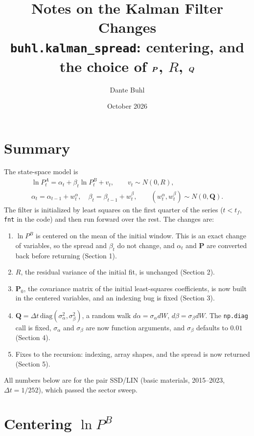\documentclass[11pt]{article}
\title{Notes on the Kalman Filter Changes\\
\large \texttt{buhl.kalman\_spread}: centering, and the choice of $\bs{P}$, $R$, $\bs{Q}$}
\author{Dante Buhl}
\date{October 2026}
\newcommand{\bs}[1]{\boldsymbol{#1}}
\begin{document}
\maketitle

\section*{Summary}

The state-space model is
\begin{gather*}
    \ln P^A_t = \alpha_t + \beta_t \ln P^B_t + v_t, \qquad v_t \sim N(0, R),
    \\
    \alpha_t = \alpha_{t-1} + w^\alpha_t, \quad
    \beta_t = \beta_{t-1} + w^\beta_t, \qquad
    (w^\alpha_t, w^\beta_t) \sim N(0, \bs{Q}).
\end{gather*}
The filter is initialized by least squares on the first quarter of the series
($t < t_f$, \texttt{fnt} in the code) and then run forward over the rest. The
changes are:
\begin{enumerate}
    \item $\ln P^B$ is centered on the mean of the initial window. This is an
    exact change of variables, so the spread and $\beta_t$ do not change, and
    $\alpha_t$ and $\bs{P}$ are converted back before returning (Section 1).
    \item $R$, the residual variance of the initial fit, is unchanged
    (Section 2).
    \item $\bs{P}_0$, the covariance matrix of the initial least-squares
    coefficients, is now built in the centered variables, and an indexing bug is
    fixed (Section 3).
    \item $\bs{Q} = \Delta t\,\mathrm{diag}(\sigma_\alpha^2, \sigma_\beta^2)$, a
    random walk $d\alpha = \sigma_\alpha dW$, $d\beta = \sigma_\beta dW$. The
    \texttt{np.diag} call is fixed, $\sigma_\alpha$ and $\sigma_\beta$ are now
    function arguments, and $\sigma_\beta$ defaults to $0.01$ (Section 4).
    \item Fixes to the recursion: indexing, array shapes, and the spread is now
    returned (Section 5).
\end{enumerate}
All numbers below are for the pair SSD/LIN (basic materials, 2015--2023,
$\Delta t = 1/252$), which passed the sector sweep.

\section{Centering $\ln P^B$}
\end{document}
